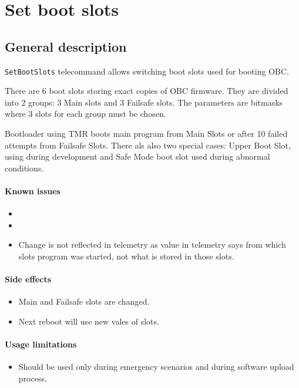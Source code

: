 \section{Set boot slots}


\subsection{General description}
\texttt{SetBootSlots} telecommand allows switching boot slots used for booting OBC. 

There are 6 boot slots storing exact copies of OBC firmware. They are divided into 2 groups: 3 Main slots and 3 Failsafe slots. 
The parameters are bitmasks where 3 slots for each group must be chosen.

Bootloader using TMR boots main program from Main Slots or after 10 failed attempts from Failsafe Slots.
There als also two special cases: Upper Boot Slot, using during development and Safe Mode boot slot used during abnormal conditions.

\paragraph{Known issues}
\begin{itemize}
    \item {}
	\item {}
	\item Change is not reflected in telemetry as value in telemetry says from which slots program was started, not what is stored in those slots.
\end{itemize}

\paragraph{Side effects}
\begin{itemize}
	\item Main and Failsafe slots are changed.
	\item Next reboot will use new vales of slots.
\end{itemize}

\paragraph{Usage limitations} 
\begin{itemize}
	\item Should be used only during emergency scenarios and during software upload process.
\end{itemize}

